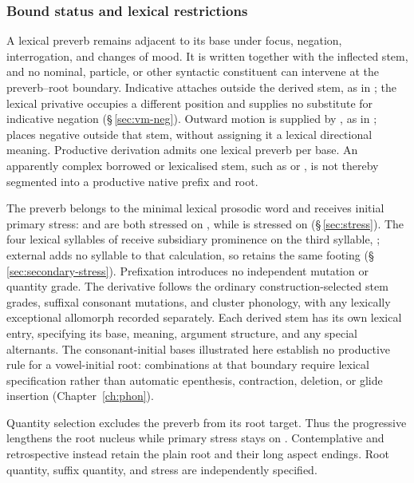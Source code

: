 \subsubsection{Bound status and lexical restrictions}

A lexical preverb remains adjacent to its base under focus, negation,
interrogation, and changes of mood. It is written together with the inflected
stem, and no nominal, particle, or other syntactic constituent can intervene at the preverb--root
boundary. Indicative  attaches outside the derived stem, as in
 ; the lexical privative
 occupies a different position and supplies no substitute for
indicative negation (§\,\ref{sec:vm-neg}). Outward motion is supplied by
, as in ; 
 places negative  outside that stem,
without assigning it a lexical directional meaning. Productive derivation
admits one lexical preverb per base. An apparently complex borrowed or lexicalised stem,
such as  or , is not thereby segmented into a
productive native prefix and root.

The preverb belongs to the minimal lexical prosodic word and receives initial
primary stress:  and  are both stressed
on , while  is stressed on 
(§\,\ref{sec:stress}). The four lexical syllables of 
receive subsidiary prominence on the third syllable, ; external
 adds no syllable to that calculation, so 
retains the same footing (§\,\ref{sec:secondary-stress}). Prefixation
introduces no independent mutation or
quantity grade. The derivative follows the ordinary construction-selected
stem grades, suffixal consonant mutations, and cluster phonology, with any
lexically exceptional allomorph recorded separately. Each derived stem has its
own lexical entry, specifying its base, meaning, argument structure, and any
special alternants. The consonant-initial bases illustrated here establish no
productive rule for a vowel-initial root: combinations at that boundary require
lexical specification rather than automatic epenthesis, contraction, deletion,
or glide insertion (Chapter~\ref{ch:phon}).

Quantity selection excludes the preverb from its root target. Thus the
progressive  lengthens the root nucleus while primary stress
stays on . Contemplative  and retrospective
 instead retain the plain root and their long aspect
endings. Root quantity, suffix quantity, and stress are independently specified.

